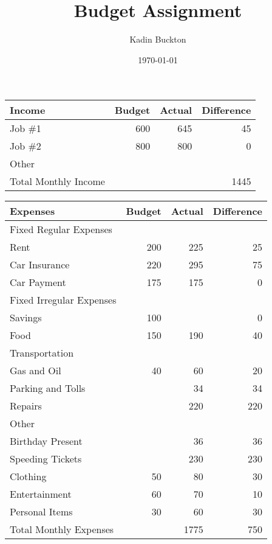 \documentclass[11pt]{article}
\author{Kadin Buckton}
\date{\today}
\title{Budget Assignment}
\begin{document}
\maketitle
\tableofcontents

\begin{center}
\begin{tabular}{lrrr}
\toprule
Income & Budget & Actual & Difference\\
\midrule
Job \#1 & 600 & 645 & 45\\
Job \#2 & 800 & 800 & 0\\
Other &  &  & \\
\midrule
Total Monthly Income &  &  & 1445\\
\bottomrule
\end{tabular}
\end{center}


\begin{center}
\begin{tabular}{lrrr}
\toprule
Expenses & Budget & Actual & Difference\\
\midrule
Fixed Regular Expenses &  &  & \\
\midrule
Rent & 200 & 225 & 25\\
Car Insurance & 220 & 295 & 75\\
Car Payment & 175 & 175 & 0\\
\midrule
Fixed Irregular Expenses &  &  & \\
\midrule
Savings & 100 &  & 0\\
Food & 150 & 190 & 40\\
\midrule
Transportation &  &  & \\
\midrule
Gas and Oil & 40 & 60 & 20\\
Parking and Tolls &  & 34 & 34\\
Repairs &  & 220 & 220\\
\midrule
Other &  &  & \\
\midrule
Birthday Present &  & 36 & 36\\
Speeding Tickets &  & 230 & 230\\
Clothing & 50 & 80 & 30\\
Entertainment & 60 & 70 & 10\\
Personal Items & 30 & 60 & 30\\
\midrule
Total Monthly Expenses &  & 1775 & 750\\
\bottomrule
\end{tabular}
\end{center}
\end{document}
